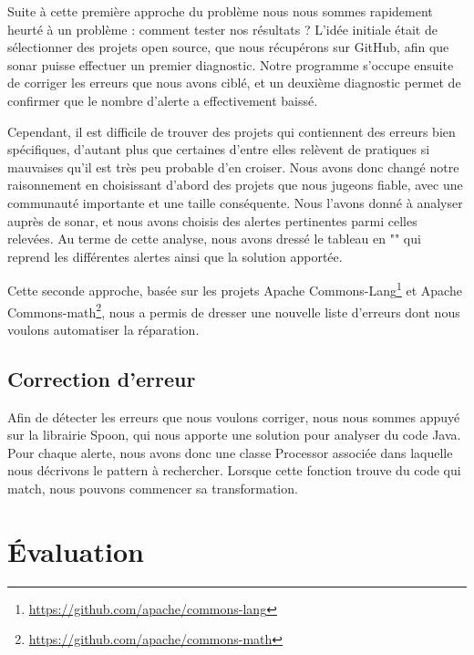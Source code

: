 \documentclass[a4paper]{article}
\begin{document}
\par Suite à cette première approche du problème nous nous sommes rapidement heurté à un problème : comment tester nos résultats ? L'idée initiale était de sélectionner des projets open source, que nous récupérons sur GitHub, afin que sonar puisse effectuer un premier diagnostic. Notre programme s'occupe ensuite de corriger les erreurs que nous avons ciblé, et un deuxième diagnostic permet de confirmer que le nombre d'alerte a effectivement baissé. 
\\
\par Cependant, il est difficile de trouver des projets qui contiennent des erreurs bien spécifiques, d'autant plus que certaines d'entre elles relèvent de pratiques si mauvaises qu'il est très peu probable d'en croiser. Nous avons donc changé notre raisonnement en choisissant d'abord des projets que nous jugeons fiable, avec une communauté importante et une taille conséquente. Nous l'avons donné à analyser auprès de sonar, et nous avons choisis des alertes pertinentes parmi celles relevées. Au terme de cette analyse, nous avons dressé le tableau en "" qui reprend les différentes alertes ainsi que la solution apportée.
\\
\par Cette seconde approche, basée sur les projets Apache Commons-Lang\footnote{\url{https://github.com/apache/commons-lang}} et Apache Commons-math\footnote{\url{https://github.com/apache/commons-math}}, nous a permis de dresser une nouvelle liste d'erreurs dont nous voulons automatiser la réparation.


\subsection{Correction d'erreur}
\par Afin de détecter les erreurs que nous voulons corriger, nous nous sommes appuyé sur la librairie Spoon, qui nous apporte une solution pour analyser du code Java. Pour chaque alerte, nous avons donc une classe Processor associée dans laquelle nous décrivons le pattern à rechercher. Lorsque cette fonction trouve du code qui match, nous pouvons commencer sa transformation.


\section{Évaluation}
\end{document}
